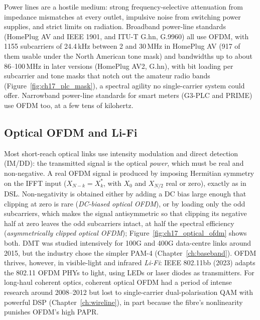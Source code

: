 Power lines are a hostile medium: strong frequency-selective attenuation from impedance mismatches at every
outlet, impulsive noise from switching power supplies, and strict limits on radiation. Broadband power-line
standards (HomePlug AV and IEEE 1901, and ITU-T G.hn, G.9960) all use OFDM, with 1155 subcarriers of
24.4\,kHz between 2 and 30\,MHz in HomePlug AV (917 of them usable under the North American tone mask) and
bandwidths up to about 86--100\,MHz in later versions (HomePlug AV2, G.hn), with bit
loading per subcarrier and tone masks that notch out the amateur radio bands (Figure~\ref{fig:ch17_plc_mask}),
a spectral agility no single-carrier system could offer. Narrowband power-line standards for smart meters
(G3-PLC and PRIME) use OFDM too, at a few tens of kilohertz.


\subsection{Optical OFDM and Li-Fi}

Most short-reach optical links use intensity modulation and direct detection (IM/DD): the transmitted signal
is the optical \emph{power}, which must be real and non-negative. A real OFDM signal is produced by imposing
Hermitian symmetry on the IFFT input ($X_{N-k}=X_k^*$, with $X_0$ and $X_{N/2}$ real or zero), exactly as in DSL.
Non-negativity is obtained either by adding a DC bias large enough that clipping at zero is rare
(\emph{DC-biased optical OFDM}), or by loading only the odd subcarriers, which makes the signal antisymmetric
so that clipping its negative half at zero leaves the odd subcarriers intact, at half the spectral efficiency
(\emph{asymmetrically clipped optical OFDM}); Figure~\ref{fig:ch17_optical_ofdm} shows both. DMT was studied
intensively for 100G and 400G data-centre links around 2015, but the industry chose the simpler PAM-4
(Chapter~\ref{ch:baseband}). OFDM thrives, however, in visible-light and infrared \emph{Li-Fi}: IEEE 802.11bb
(2023) adapts the 802.11 OFDM PHYs to light, using LEDs or laser diodes as transmitters. For long-haul coherent
optics, coherent optical OFDM had a period of intense research around 2008--2012 but lost to single-carrier
dual-polarisation QAM with powerful DSP (Chapter~\ref{ch:wireline}), in part because the fibre's nonlinearity
punishes OFDM's high PAPR.

